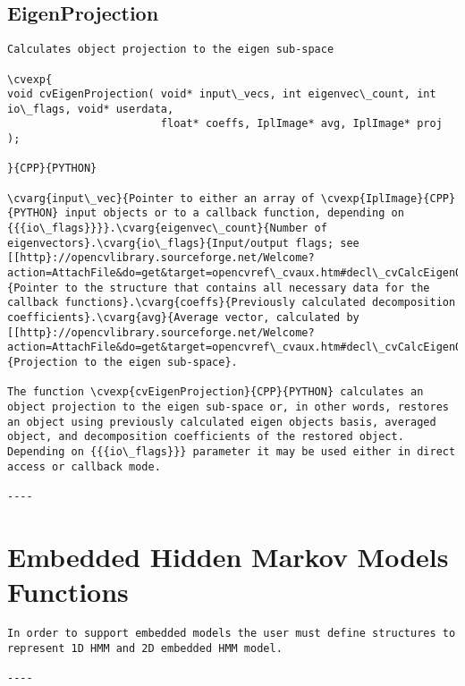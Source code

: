 \subsection{EigenProjection}
\begin{verbatim}
Calculates object projection to the eigen sub-space

\cvexp{
void cvEigenProjection( void* input\_vecs, int eigenvec\_count, int io\_flags, void* userdata,
                        float* coeffs, IplImage* avg, IplImage* proj );

}{CPP}{PYTHON}

\cvarg{input\_vec}{Pointer to either an array of \cvexp{IplImage}{CPP}{PYTHON} input objects or to a callback function, depending on {{{io\_flags}}}}.\cvarg{eigenvec\_count}{Number of eigenvectors}.\cvarg{io\_flags}{Input/output flags; see [[http}://opencvlibrary.sourceforge.net/Welcome?action=AttachFile&do=get&target=opencvref\_cvaux.htm#decl\_cvCalcEigenObjects|cvCalcEigenObjects]].\cvarg{userdata}{Pointer to the structure that contains all necessary data for the callback functions}.\cvarg{coeffs}{Previously calculated decomposition coefficients}.\cvarg{avg}{Average vector, calculated by [[http}://opencvlibrary.sourceforge.net/Welcome?action=AttachFile&do=get&target=opencvref\_cvaux.htm#decl\_cvCalcEigenObjects|cvCalcEigenObjects]].\cvarg{proj}{Projection to the eigen sub-space}.

The function \cvexp{cvEigenProjection}{CPP}{PYTHON} calculates an object projection to the eigen sub-space or, in other words, restores an object using previously calculated eigen objects basis, averaged object, and decomposition coefficients of the restored object. Depending on {{{io\_flags}}} parameter it may be used either in direct access or callback mode.

----
\end{verbatim}
\section{Embedded Hidden Markov Models Functions}
\begin{verbatim}
In order to support embedded models the user must define structures to represent 1D HMM and 2D embedded HMM model.

----
\end{verbatim}

